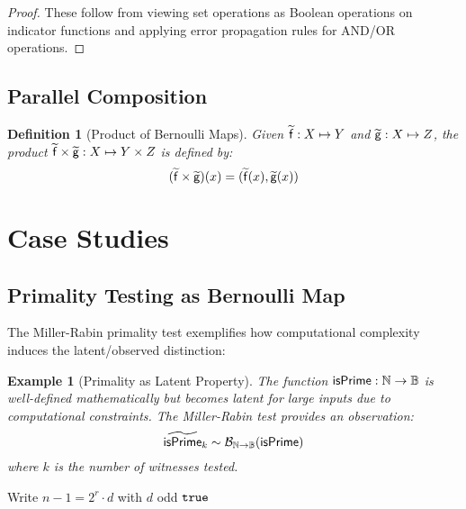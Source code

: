 \documentclass[11pt,final,hidelinks]{article}
\newtheorem{definition}[theorem]{Definition}
\newtheorem{example}[theorem]{Example}
\newcommand{\AFun}[1]{\obs{\mathsf{#1}}}  %
\newcommand{\Set}[1]{#1}              %
\begin{document}
\begin{proof}
These follow from viewing set operations as Boolean operations on indicator functions and applying error propagation rules for AND/OR operations.
\end{proof}

\subsection{Parallel Composition}

\begin{definition}[Product of Bernoulli Maps]
Given $\AFun{f} : \Set{X} \mapsto \Set{Y}$ and $\AFun{g} : \Set{X} \mapsto \Set{Z}$, the product $\AFun{f} \times \AFun{g} : \Set{X} \mapsto \Set{Y} \times \Set{Z}$ is defined by:
\begin{equation}
(\AFun{f} \times \AFun{g})(x) = (\AFun{f}(x), \AFun{g}(x))
\end{equation}
\end{definition}

\section{Case Studies}

\subsection{Primality Testing as Bernoulli Map}

The Miller-Rabin primality test exemplifies how computational complexity induces the latent/observed distinction:

\begin{example}[Primality as Latent Property]
The function $\mathsf{isPrime}: \mathbb{N} \to \mathbb{B}$ is well-defined mathematically but becomes \emph{latent} for large inputs due to computational constraints. The Miller-Rabin test provides an \emph{observation}:
\begin{equation}
\widetilde{\mathsf{isPrime}}_k \sim \mathcal{B}_{\mathbb{N} \to \mathbb{B}}(\mathsf{isPrime})
\end{equation}
where $k$ is the number of witnesses tested.
\end{example}

\begin{algorithm}[H]
\SetAlgoLined
{}
Write $n-1 = 2^r \cdot d$ with $d$ odd\;
\Return $\mathtt{true}$\;
\caption{Miller-Rabin Primality Test}
\end{algorithm}
\end{document}
